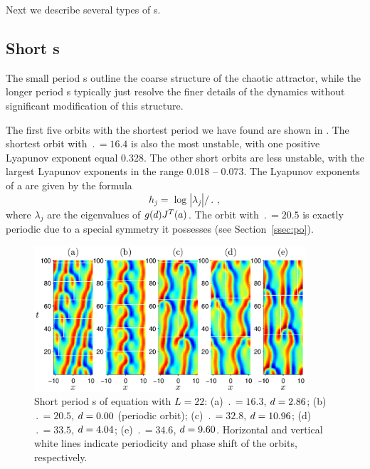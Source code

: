 Next we describe several types of \rpo s.

\subsection{Short \rpo s}  The small period \rpo s outline the
coarse structure of the chaotic attractor, while the longer period
\rpo s typically just resolve the finer details of the dynamics
without significant modification of this structure.

The first five orbits with the shortest period we have found are
shown in .  The shortest orbit with $\period{} =
16.4$ is also the most unstable, with one positive Lyapunov exponent
equal 0.328.  The other short orbits are less unstable, with the
largest Lyapunov exponents in the range 0.018 -- 0.073.  The
Lyapunov exponents of a \rpo are given by the formula
\[h_j = \log |\lambda_j|/\period{}\,,\]
where $\lambda_j$ are the eigenvalues of $g(d)J^T(a)$.  The
orbit with $\period{} = 20.5$ is exactly periodic due to a special symmetry
it possesses (see Section~\ref{ssec:po}).

\begin{figure}[t]
\begin{center}
\includegraphics[width=0.9\textwidth]{figs/ks22rposShort.eps}
\end{center}
\caption{Short period \rpo s of \KS equation with $L = 22$: (a) $\period{} =
16.3$, $d = 2.86$; (b) $\period{} = 20.5$, $d = 0.00$ (periodic
orbit); (c) $\period{} = 32.8$, $d = 10.96$; (d) $\period{} = 33.5$, $d =
4.04$; (e) $\period{} = 34.6$, $d = 9.60$.  Horizontal and vertical
white lines indicate periodicity and phase shift of the orbits,
respectively. }\label{f:ks22rposShort}
\end{figure}


